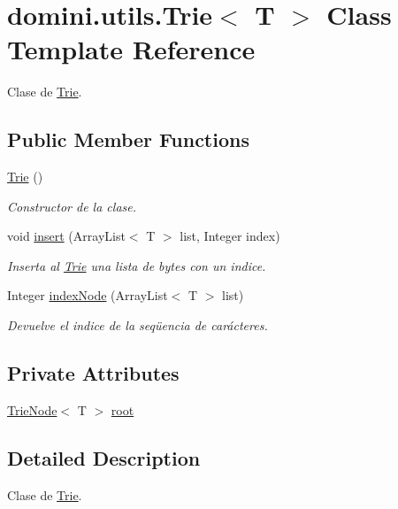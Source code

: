 \hypertarget{classdomini_1_1utils_1_1Trie}{}\section{domini.\+utils.\+Trie$<$ T $>$ Class Template Reference}
\label{classdomini_1_1utils_1_1Trie}


Clase de \hyperlink{classdomini_1_1utils_1_1Trie}{Trie}.  


\subsection*{Public Member Functions}
\begin{DoxyCompactItemize}
\item 
\hyperlink{classdomini_1_1utils_1_1Trie_aa47b21b235e9dab115f3f97726837d5f}{Trie} ()
\begin{DoxyCompactList}\small\item\em Constructor de la clase. \end{DoxyCompactList}\item 
void \hyperlink{classdomini_1_1utils_1_1Trie_a3599001d9b056f0b54ab7eabb9d3510b}{insert} (Array\+List$<$ T $>$ list, Integer index)
\begin{DoxyCompactList}\small\item\em Inserta al \hyperlink{classdomini_1_1utils_1_1Trie}{Trie} una lista de bytes con un indice. \end{DoxyCompactList}\item 
Integer \hyperlink{classdomini_1_1utils_1_1Trie_a5c30e36df9ab804bbc054805358ecf2a}{index\+Node} (Array\+List$<$ T $>$ list)
\begin{DoxyCompactList}\small\item\em Devuelve el indice de la seqüencia de carácteres. \end{DoxyCompactList}\end{DoxyCompactItemize}
\subsection*{Private Attributes}
\begin{DoxyCompactItemize}
\item 
\hyperlink{classdomini_1_1utils_1_1TrieNode}{Trie\+Node}$<$ T $>$ \hyperlink{classdomini_1_1utils_1_1Trie_a60ef63a6c55d07710d33892ccc899bce}{root}
\end{DoxyCompactItemize}


\subsection{Detailed Description}
Clase de \hyperlink{classdomini_1_1utils_1_1Trie}{Trie}. 

